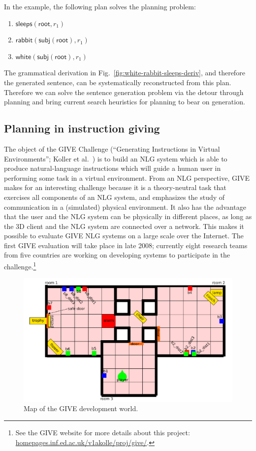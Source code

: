 In the example, the following plan solves the planning problem:
\begin{enumerate}
\item $\mathsf{sleeps}(\mathsf{root}, r_1)$
\item $\mathsf{rabbit}(\mathsf{subj}(\mathsf{root}), r_1)$
\item $\mathsf{white}(\mathsf{subj}(\mathsf{root}), r_1)$
\end{enumerate}

The grammatical derivation in
Fig.~\ref{fig:white-rabbit-sleeps-deriv}, and therefore the generated
sentence, can be systematically reconstructed from this plan.
Therefore we can solve the sentence generation problem via the detour
through planning and bring current search heuristics for planning to
bear on generation.



\subsection{Planning in instruction giving}

The object of the GIVE Challenge (``Generating Instructions in Virtual
Environments''; Koller et al.\ \citeyear{alexander07:_shared_task_propos})
is to build an NLG system which is able to produce natural-language
instructions which will guide a human user in performing some task in a
virtual environment. From an NLG perspective, GIVE makes for an
interesting challenge because it is a theory-neutral task that exercises
all components of an NLG system, and emphasizes the study of communication
in a (simulated) physical environment. It also has the advantage that the
user and the NLG system can be physically in different places, as long as
the 3D client and the NLG system are connected over a network. This makes
it possible to evaluate GIVE NLG systems on a large scale over the
Internet. The first GIVE evaluation will take place in late 2008;
currently eight research teams from five countries are working on
developing systems to participate in the challenge.\footnote{See the GIVE
 website for more details about this project:
 \url{homepages.inf.ed.ac.uk/v1akolle/proj/give/}.}

\begin{figure}
\centering
\includegraphics[width=1 \columnwidth]{give_world_2}
\caption{Map of the GIVE development world.}
  \label{fig:give-development-world}
\end{figure}

